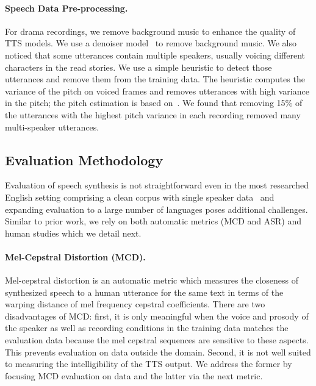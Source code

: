 \paragraph{Speech Data Pre-processing.}
For drama recordings, we remove background music to enhance the quality of TTS models.
We use a denoiser model~\citep{defossez2020real} to remove background music.
We also noticed that some utterances contain multiple speakers, usually voicing different characters in the read stories. 
We use a simple heuristic to detect those utterances and remove them from the training data.
The heuristic computes the variance of the pitch on voiced frames and removes utterances with high variance in the pitch; the pitch estimation is based on~\citet{Mauch2014PYINAF}.
We found that removing 15\% of the utterances with the highest pitch variance in each recording removed many multi-speaker utterances.



\subsection{Evaluation Methodology}
\label{sec:tts-eval}

Evaluation of speech synthesis is not straightforward even in the most researched English setting comprising a clean corpus with single speaker data~\citep{ljspeech17} and expanding evaluation to a large number of languages poses additional challenges.
Similar to prior work, we rely on both automatic metrics (MCD and ASR) and human studies which we detail next.

\paragraph{Mel-Cepstral Distortion (MCD).}
Mel-cepstral distortion is an automatic metric which measures the closeness of synthesized speech to a human utterance for the same text in terms of the warping distance of mel frequency cepstral coefficients.
There are two disadvantages of MCD:
first, it is only meaningful when the voice and prosody of the speaker as well as recording conditions in the training data matches the evaluation data because the mel cepstral sequences are sensitive to these aspects.
This prevents evaluation on data outside the \MMS{} domain.
Second, it is not well suited to measuring the intelligibility of the TTS output.
We address the former by focusing MCD evaluation on \MMS{} data and the latter via the next metric.

